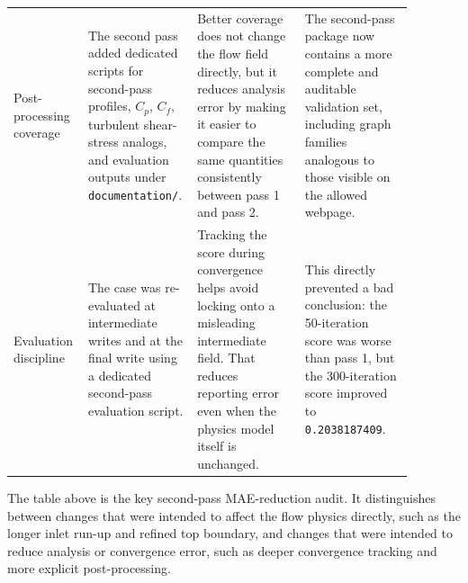 \documentclass[11pt]{article}
\begin{document}
\begin{longtable}{p{0.18\linewidth} p{0.18\linewidth} p{0.26\linewidth} p{0.26\linewidth}}
Post-processing coverage & The second pass added dedicated scripts for second-pass profiles, \(C_p\), \(C_f\), turbulent shear-stress analogs, and evaluation outputs under \texttt{documentation/}. & Better coverage does not change the flow field directly, but it reduces analysis error by making it easier to compare the same quantities consistently between pass 1 and pass 2. & The second-pass package now contains a more complete and auditable validation set, including graph families analogous to those visible on the allowed webpage. \\
Evaluation discipline & The case was re-evaluated at intermediate writes and at the final write using a dedicated second-pass evaluation script. & Tracking the score during convergence helps avoid locking onto a misleading intermediate field. That reduces reporting error even when the physics model itself is unchanged. & This directly prevented a bad conclusion: the 50-iteration score was worse than pass 1, but the 300-iteration score improved to \texttt{0.2038187409}. \\
\bottomrule
\end{longtable}

The table above is the key second-pass MAE-reduction audit. It distinguishes between changes that were intended to affect the flow physics directly, such as the longer inlet run-up and refined top boundary, and changes that were intended to reduce analysis or convergence error, such as deeper convergence tracking and more explicit post-processing.
\end{document}
